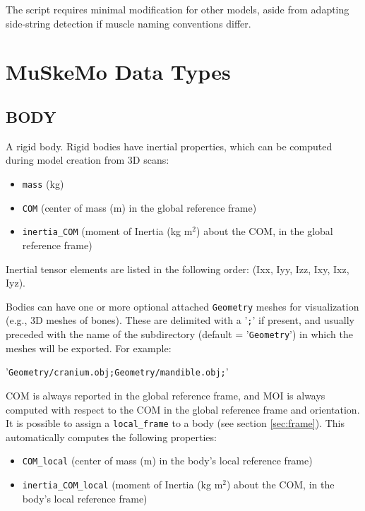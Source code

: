 \documentclass{article}
\begin{document}
\noindent The script requires minimal modification for other models, aside from adapting side-string detection if muscle naming conventions differ.



\section{MuSkeMo Data Types}
\label{sec:DataTypes}



\subsection{BODY}
\label{sec:body}

A rigid body. Rigid bodies have inertial properties, which can be computed during model creation from 3D scans:

\begin{itemize}
    \item \texttt{mass} (kg)
    \item \texttt{COM} (center of mass (m) in the global reference frame)
    \item \texttt{inertia\_COM} (moment of Inertia (kg m\(^2\)) about the COM, in the global reference frame)
\end{itemize}

Inertial tensor elements are listed in the following order: (Ixx, Iyy, Izz, Ixy, Ixz, Iyz).

Bodies can have one or more optional attached \texttt{Geometry} meshes for visualization (e.g., 3D meshes of bones). These are delimited with a '\texttt{;}' if present, and usually preceded with the name of the subdirectory (default = '\texttt{Geometry}') in which the meshes will be exported. For example: 

'\texttt{Geometry/cranium.obj;Geometry/mandible.obj;}'

COM is always reported in the global reference frame, and MOI is always computed with respect to the COM in the global reference frame and orientation. It is possible to assign a \texttt{local\_frame} to a body (see section \ref{sec:frame}). This automatically computes the following properties:


\begin{itemize}
    \item \texttt{COM\_local} (center of mass (m) in the body's local reference frame)
    \item \texttt{inertia\_COM\_local} (moment of Inertia (kg m\(^2\)) about the COM, in the body's local reference frame)
\end{itemize}
\end{document}
